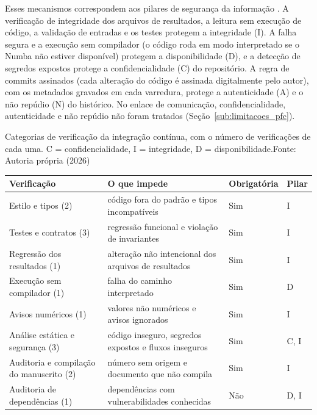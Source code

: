 \documentclass{pfccefsa}
\begin{document}
Esses mecanismos correspondem aos pilares de segurança da informação
\cite{ISO27000}. A verificação de integridade dos arquivos de resultados, a
leitura sem execução de código, a validação de entradas e os testes protegem a
integridade (I). A falha segura e a execução sem compilador (o código roda em
modo interpretado se o Numba não estiver disponível) protegem a disponibilidade
(D), e a detecção de segredos expostos protege a confidencialidade (C) do
repositório. A regra de commits assinados (cada alteração do código é assinada
digitalmente pelo autor), com os metadados gravados em cada varredura, protege a
autenticidade (A) e o não repúdio (N) do histórico. No enlace de comunicação,
confidencialidade, autenticidade e não repúdio não foram tratados
(Seção~\ref{sub:limitacoes_pfc}).

\begin{quadro}{Categorias de verificação da integração contínua, com o número de
verificações de cada uma. C = confidencialidade, I = integridade,
D = disponibilidade.}{Fonte: Autoria própria (2026)}
\setlength{\tabcolsep}{2bp}%
\begin{tabular}[t]{|>{\raggedright\arraybackslash}p{150bp}|>{\raggedright\arraybackslash}p{205bp}|>{\centering\arraybackslash}p{70bp}|>{\centering\arraybackslash}p{55bp}|}
\hline
\textbf{Verificação} & \textbf{O que impede} & \textbf{Obrigatória} & \textbf{Pilar} \\
\hline
Estilo e tipos (2) & código fora do padrão e tipos incompatíveis & Sim & I \\
\hline
Testes e contratos (3) & regressão funcional e violação de invariantes & Sim & I \\
\hline
Regressão dos resultados (1) & alteração não intencional dos arquivos de resultados & Sim & I \\
\hline
Execução sem compilador (1) & falha do caminho interpretado & Sim & D \\
\hline
Avisos numéricos (1) & valores não numéricos e avisos ignorados & Sim & I \\
\hline
Análise estática e segurança (3) & código inseguro, segredos expostos e fluxos inseguros & Sim & C, I \\
\hline
Auditoria e compilação do manuscrito (2) & número sem origem e documento que não compila & Sim & I \\
\hline
Auditoria de dependências (1) & dependências com vulnerabilidades conhecidas & Não & D, I \\
\hline
\end{tabular}
\label{qua:ci_pfc}
\end{quadro}
\end{document}
